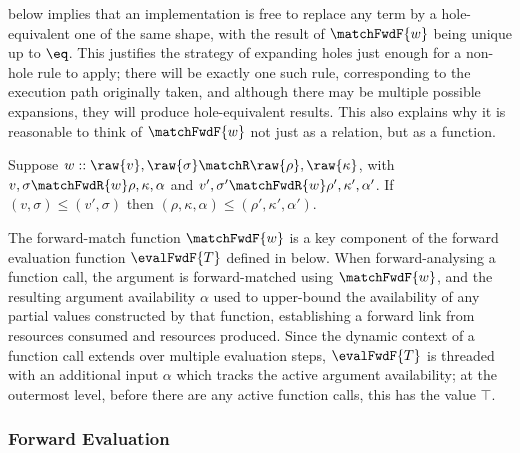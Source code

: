 \vspace{2mm}
\noindent {} below implies that an implementation is free to replace any term by a hole-equivalent one of the same shape, with the result of $\matchFwdF{w}$ being unique up to $\eq$. This justifies the strategy of expanding holes just enough for a non-hole rule to apply; there will be exactly one such rule, corresponding to the execution path originally taken, and although there may be multiple possible expansions, they will produce hole-equivalent results. This also explains why it is reasonable to think of $\matchFwdF{w}$ not just as a relation, but as a function.

\begin{lemma}
\label{lem:match-fwd:monotonic}
   Suppose $w :: \raw{v}, \raw{\sigma} \matchR \raw{\rho}, \raw{\kappa}$, with $v, \sigma \matchFwdR{w} \rho, \kappa, \alpha$ and $v', \sigma' \matchFwdR{w} \rho', \kappa', \alpha'$. If $(v, \sigma) \leq (v', \sigma)$ then $(\rho, \kappa, \alpha) \leq (\rho', \kappa', \alpha')$.
\end{lemma}



The forward-match function $\matchFwdF{w}$ is a key component of the forward evaluation function $\evalFwdF{T}$ defined in  below. When forward-analysing a function call, the argument is forward-matched using $\matchFwdF{w}$, and the resulting argument availability $\alpha$ used to upper-bound the availability of any partial values constructed by that function, establishing a forward link from resources consumed and resources produced. Since the dynamic context of a function call extends over multiple evaluation steps, $\evalFwdF{T}$ is threaded with an additional input $\alpha$ which tracks the active argument availability; at the outermost level, before there are any active function calls, this has the value $\top$.

\subsubsection{Forward Evaluation}
\label{sec:data-dependencies:forward-eval}

